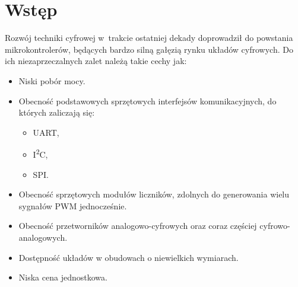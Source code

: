 \documentclass[11pt, twoside]{Thesis} %
\begin{document}



\pagestyle{fancy} %

\setcounter{page}{7}
%

\chapter{Wstęp} %

\label{Chapter1} %


Rozwój techniki cyfrowej w~trakcie ostatniej dekady doprowadził do powstania mikrokontrolerów, będących bardzo silną gałęzią rynku układów cyfrowych. Do ich niezaprzeczalnych zalet należą takie cechy jak:

\begin{itemize}
	\item Niski pobór mocy.
	\item Obecność podstawowych sprzętowych interfejsów komunikacyjnych, do których zaliczają się:
		\begin{itemize}
			\item UART,
			\item I\textsuperscript{2}C,
			\item SPI.
		\end{itemize}
	\item Obecność sprzętowych modułów liczników, zdolnych do generowania wielu sygnałów PWM jednocześnie.
	\item Obecność przetworników analogowo-cyfrowych oraz coraz częściej cyfrowo-analogowych.
	\item Dostępność układów w obudowach o niewielkich wymiarach.
	\item Niska cena jednostkowa.
\end{itemize}
\end{document}
